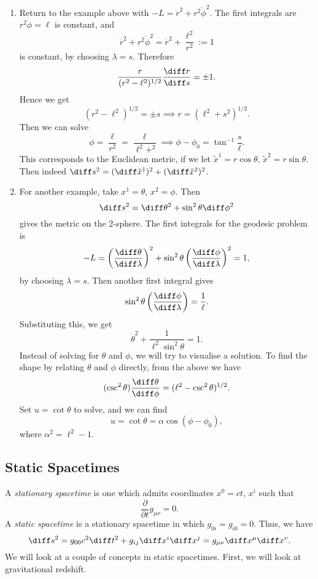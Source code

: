 \documentclass[12pt]{article}
\begin{document}
\begin{exbox}
	\begin{enumerate}
		\item Return to the example above with $-L = \dot r^2 + r^2 \dot \phi^2$. The first integrals are $r^2 \dot \phi = \ell$ is constant, and
			\[
			\dot r^2 + r^2 \dot \phi^2 = \dot r^2 + \frac{\ell^2}{r^2} := 1
			\]
			is constant, by choosing $\lambda = s$. Therefore
			\[
			\frac{r}{(r^2 - \ell^2)^{1/2}} \frac{\diff r}{\diff s} = \pm 1.
			\] Hence we get
			\[
				(r^2 - \ell^2)^{1/2} = \pm s \implies r = (\ell^2 + s^2)^{1/2}.
			\]
			Then we can solve
			\[
			\dot \phi = \frac{\ell }{r^2} = \frac{\ell }{\ell^2 + ^2} \implies \phi - \phi_0 = \tan^{-1} \frac{s}{\ell }.
			\]
			This corresponds to the Euclidean metric, if we let $\tilde x^1 = r \cos \theta$, $\tilde x^2 = r \sin \theta$. Then indeed $\diff s^2 = (\diff \tilde x^1)^2 + (\diff \tilde x^2)^2$.
		\item For another example, take $x^1 = \theta$, $x^2 = \phi$. Then
			\[
			\diff s^2 = \diff \theta^2 + \sin^2 \theta \diff \phi^2
			\]
			gives the metric on the 2-sphere. The first integrals for the geodesic problem is
			\[
			- L = \left( \frac{\diff \theta}{\diff \lambda}\right)^2 + \sin^2 \theta \left( \frac{\diff \phi}{\diff \lambda}\right)^2 = 1,
			\]
			by choosing $\lambda = s$. Then another first integral gives
			\[
			\sin^2 \theta \left( \frac{\diff \phi}{\diff \lambda} \right) = \frac{1}{\ell }.
			\]
			Substituting this, we get
			\[
			\dot \theta^2 + \frac{1}{\ell^2 \sin^2\theta} = 1.
			\]
			Instead of solving for $\theta$ and $\phi$, we will try to visualise a solution. To find the shape by relating $\theta$ and $\phi$ directly, from the above we have
			\[
				(\csc^2 \theta) \frac{\diff \theta}{\diff \phi} = (\ell^2 - \csc^2 \theta)^{1/2}.
			\]
			Set $u = \cot \theta$ to solve, and we can find
			\[
			u = \cot \theta = \alpha \cos(\phi - \phi_0),
			\]
			where $\alpha^2 = \ell^2 - 1$.
	\end{enumerate}
\end{exbox}

\subsection{Static Spacetimes}
\label{sub:stat_spac}

A \emph{stationary spacetime} is one which admits coordinates $x^0 = ct$, $x^i$ such that
\[
\frac{\partial}{\partial t}g_{\mu \nu} = 0.
\]
A \emph{static spacetime} is a stationary spacetime in which $g_{0i} = g_{i0} = 0$. Thus, we have
\[
\diff s^2 = g_{00}c^2\diff t^2 + g_{ij} \diff x^i \diff x^j = g_{\mu \nu} \diff x^\mu \diff x^\nu.
\]
We will look at a couple of concepts in static spacetimes. First, we will look at gravitational redshift.
\end{document}
